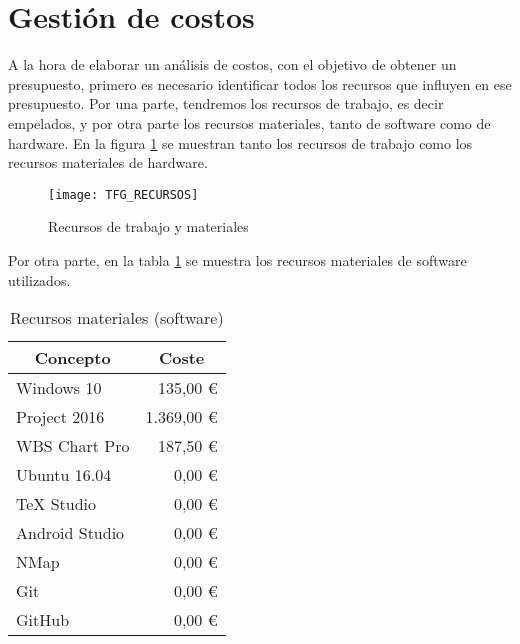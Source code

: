 

\section{Gestión de costos}
A la hora de elaborar un análisis de costos, con el objetivo de obtener un presupuesto, primero es necesario identificar todos los recursos que influyen en ese presupuesto. Por una parte, tendremos los recursos de trabajo, es decir empelados, y por otra parte los recursos materiales, tanto de software como de hardware. En la figura \ref{fig:recursos} se muestran tanto los recursos de trabajo como los recursos materiales de hardware.

\begin{figure}[H]
	\centering
	\texttt{[image: TFG\_RECURSOS]}
	\caption{Recursos de trabajo y materiales}
	\label{fig:recursos}
\end{figure}

Por otra parte, en la tabla \ref{table:software} se muestra los recursos materiales de software utilizados.

\begin{table}[H]
	\centering
	\begin{tabular}{ |l|r| } 
		\hline
		\multicolumn{1}{|c|}{Concepto} & 
			\multicolumn{1}{|c|}{Coste} \\
		\hline
		Windows 10 		& 135,00 \euro \cite{precio-win10}		\\
		Project 2016 	& 1.369,00 \euro \cite{precio-project}	\\
		WBS Chart Pro 	& 187,50 \euro \cite{precio-wbs}		\\
		Ubuntu 16.04 	& 0,00 \euro							\\
		TeX Studio 		& 0,00 \euro							\\
		Android Studio 	& 0,00 \euro							\\
		NMap 			& 0,00 \euro							\\
		Git 			& 0,00 \euro							\\
		GitHub 			& 0,00 \euro							\\
		\hline
	\end{tabular}
	\caption{Recursos materiales (software)}
	\label{table:software}
\end{table}


